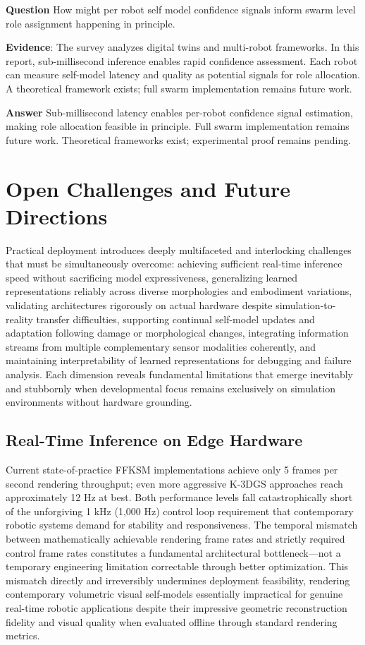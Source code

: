 ﻿\documentclass[11pt,a4paper]{article}
\begin{document}
\textbf{Question} How might per robot self model confidence signals inform swarm level role assignment happening in principle.

\textbf{Evidence}: The survey analyzes digital twins and multi-robot frameworks. In this report, sub-millisecond inference enables rapid confidence assessment. Each robot can measure self-model latency and quality as potential signals for role allocation. A theoretical framework exists; full swarm implementation remains future work.

\textbf{Answer} Sub-millisecond latency enables per-robot confidence signal estimation, making role allocation feasible in principle. Full swarm implementation remains future work. Theoretical frameworks exist; experimental proof remains pending.

\section{Open Challenges and Future Directions}

Practical deployment introduces deeply multifaceted and interlocking challenges that must be simultaneously overcome: achieving sufficient real-time inference speed without sacrificing model expressiveness, generalizing learned representations reliably across diverse morphologies and embodiment variations, validating architectures rigorously on actual hardware despite simulation-to-reality transfer difficulties, supporting continual self-model updates and adaptation following damage or morphological changes, integrating information streams from multiple complementary sensor modalities coherently, and maintaining interpretability of learned representations for debugging and failure analysis. Each dimension reveals fundamental limitations that emerge inevitably and stubbornly when developmental focus remains exclusively on simulation environments without hardware grounding.

\subsection{Real-Time Inference on Edge Hardware}

Current state-of-practice FFKSM implementations achieve only 5 frames per second rendering throughput; even more aggressive K-3DGS approaches reach approximately 12 Hz at best. Both performance levels fall catastrophically short of the unforgiving 1 kHz (1,000 Hz) control loop requirement that contemporary robotic systems demand for stability and responsiveness. The temporal mismatch between mathematically achievable rendering frame rates and strictly required control frame rates constitutes a fundamental architectural bottleneck—not a temporary engineering limitation correctable through better optimization. This mismatch directly and irreversibly undermines deployment feasibility, rendering contemporary volumetric visual self-models essentially impractical for genuine real-time robotic applications despite their impressive geometric reconstruction fidelity and visual quality when evaluated offline through standard rendering metrics.
\end{document}
